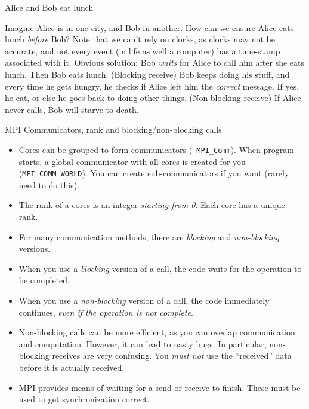 \documentclass[aspectratio=169]{beamer}
\newcommand{\mypause}{\pause}
\begin{document}
\begin{frame}{Alice and Bob eat lunch}

  {\color{blue} Imagine Alice is in one city, and Bob in another. How
    can we ensure Alice eats lunch \emph{before} Bob?}  \vskip0.1in%
  \mypause%
  Note that we can't rely on clocks, as clocks may not be accurate,
  and not every event (in life as well a computer) has a time-stamp
  associated with it.%
  \vskip0.1in%
  \mypause%
  Obvious solution: Bob \emph{waits} for Alice to call him after she
  eats lunch. Then Bob eats lunch. (Blocking receive)%
  \vskip0.1in%
  \mypause%
  Bob keeps doing his stuff, and every time he gets hungry, he checks
  if Alice left him the \emph{correct} message. If yes, he eat, or
  else he goes back to doing other things. (Non-blocking receive)%
  \vskip0.1in%
  \mypause%
  If Alice never calls, Bob will starve to death.
\end{frame}

\begin{frame}{MPI Communicators, rank and blocking/non-blocking calls}
  \footnotesize%
  \begin{itemize}
  \item Cores can be grouped to form communicators ({\tt
      MPI\_Comm}). When program starts, a global communicator with all
    cores is created for you ({\tt MPI\_COMM\_WORLD}). You can create
    sub-communicators if you want (rarely need to do this).
  \item The rank of a cores is an integer \emph{starting from 0}. Each
    core has a unique rank.
  \item For many communication methods, there are \emph{blocking} and
    \emph{non-blocking} versions.
  \item When you use a \emph{blocking} version of a call, the code waits
    for the operation to be completed.
  \item When you use a \emph{non-blocking} version of a call, the code
    immediately continues, \emph{even if the operation is not
      complete}.
  \item Non-blocking calls can be more efficient, as you can overlap
    communication and computation. However, it can lead to nasty
    bugs. In particular, non-blocking receives are very confusing. You
    \emph{must not} use the ``received'' data before it is actually
    received.
  \item MPI provides means of waiting for a send or receive to
    finish. These must be used to get synchronization correct.
  \end{itemize}
  
\end{frame}
\end{document}

